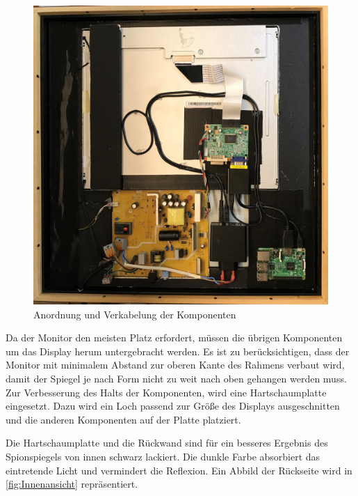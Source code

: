 \begin{figure}
	\includegraphics[scale=0.06]{bilder/Innenansicht.jpg}
	\caption{Anordnung und Verkabelung der Komponenten}
	\label{fig:Innenansicht}
\end{figure}
Da der Monitor den meisten Platz erfordert, müssen die übrigen Komponenten um das Display herum untergebracht werden. 
Es ist zu berücksichtigen, dass der Monitor mit  minimalem Abstand zur oberen Kante des Rahmens verbaut wird, damit der Spiegel je nach Form nicht zu weit nach oben gehangen werden muss. 
Zur Verbesserung des Halts der Komponenten, wird eine Hartschaumplatte eingesetzt. 
Dazu wird ein Loch passend zur Größe des Displays ausgeschnitten und die anderen Komponenten auf der Platte platziert. 

Die Hartschaumplatte und die Rückwand sind für ein besseres Ergebnis des Spionspiegels von innen schwarz lackiert. 
Die dunkle Farbe absorbiert das eintretende Licht und vermindert die Reflexion. Ein Abbild der Rückseite wird in \autoref{fig:Innenansicht} repräsentiert.

